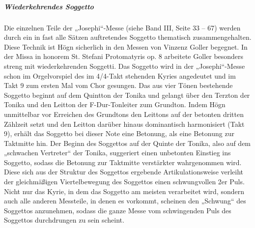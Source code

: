 \documentclass[a4paper]{article}
\begin{document}
\clearpage\subparagraph{Wiederkehrendes Soggetto}
Die einzelnen Teile der „Josephi“-Messe (siehe Band III, Seite 33 – 67)
werden durch ein in fast alle Sätzen auftretendes Soggetto thematisch
zusammengehalten. Diese Technik ist Högn sicherlich in den Messen von
Vinzenz Goller begegnet. In der Missa in honorem St. Stefani
Protomatyris op. 8 arbeitete Goller besonders streng mit
wiederkehrenden Soggetti. Das Soggetto wird in der „Josephi“-Messe
schon im Orgelvorspiel des im 4/4-Takt stehenden Kyries angedeutet und
im Takt 9 zum ersten Mal vom Chor gesungen. Das aus vier Tönen
bestehende Soggetto beginnt auf dem Quintton der Tonika und gelangt
über den Terzton der Tonika und den Leitton der F-Dur-Tonleiter zum
Grundton. Indem Högn unmittelbar vor Erreichen des Grundtons den
Leittons auf der betonten dritten Zählzeit setzt und den Leitton
darüber hinaus dominantisch harmonisiert (Takt 9), erhält das Soggetto
bei dieser Note eine Betonung, als eine Betonung zur Taktmitte hin. Der
Beginn des Soggettos auf der Quinte der Tonika, also auf dem „schwachen
Vertreter“ der Tonika, suggeriert einen unbetonten Einstieg ins
Soggetto, sodass die Betonung zur Taktmitte verstärkter wahrgenommen
wird. Diese sich aus der Struktur des Soggettos ergebende
Artikulationsweise verleiht der gleichmäßigen Viertelbewegung des
Soggettos einen schwungvollen 2er Puls. Nicht nur das Kyrie, in dem das
Soggetto am meisten verarbeitet wird, sondern auch alle anderen
Messteile, in denen es vorkommt, scheinen den „Schwung“ des Soggettos
anzunehmen, sodass die ganze Messe vom schwingenden Puls des Soggettos
durchdrungen zu sein scheint.
\end{document}
